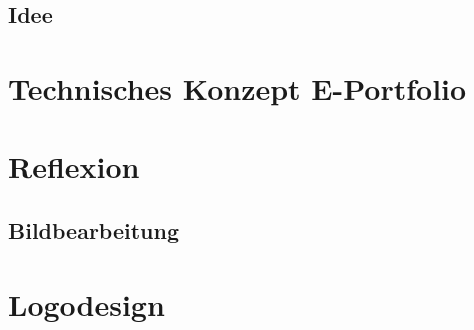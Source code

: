 \documentclass[11pt]{article}
\begin{document}
    \subsection{Idee}

    \section{Technisches Konzept E-Portfolio}

    \section{Reflexion}

    \subsection{Bildbearbeitung}

    \section{Logodesign}
\end{document}
